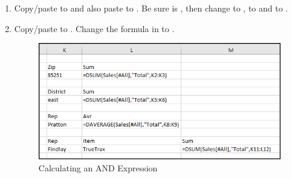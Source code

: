 \begin{enumerate}
	\item Copy/paste  to  and also paste  to . Be sure  is , then change  to ,  to  and  to .
	\item Copy/paste  to . Change the formula in  to . 
	
	\begin{figure}[H]
		\centering
		\includegraphics[width=\maxwidth{.95\linewidth}]{gfx/ch09_fig22}
		\caption{Calculating an AND Expression}
		\label{09:fig22}
	\end{figure}
	

\end{enumerate}
